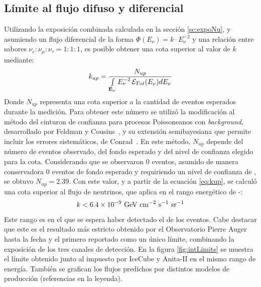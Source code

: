 	\subsection{L\'imite al flujo difuso y diferencial}
	
	Utilizando la exposici\'on combinada calculada en la secci\'on \ref{sc:expoNu}, y asumiendo un flujo diferencial de la forma $\Phi(E_\nu)= k\cdot E_\nu^{-2}$ y una relaci\'on entre sabores $\nu_e:\nu_\mu:\nu_\tau=1:1:1$, es posible obtener una cota superior al valor de $k$ mediante:
	\begin{equation}
	 k_{up}=\frac{N_{up}}{\int\limits_{\mathbf{E_{\nu}}} E_\nu^{-2}\,{\cal E}_{Tot}(E_\nu) dE_\nu}
	 \label{eq:kup}
	\end{equation}
	Donde $N_{up}$ representa una cota superior a la cantidad de eventos esperados durante la medici\'on.
	Para obtener este n\'umero se utiliz\'o la modificaci\'on al m\'etodo del cinturon de confianza para procesos Poissoneanos con \emph{background}, desarrollado por Feldman y Cousins~\cite{cite:Feldman-Cousins}, y su extensi\'on semibayesiana que permite incluir los errores sistem\'aticos, de Conrad~\cite{cite:Conrad_limit}.
	En este m\'etodo, $N_{up}$ depende del n\'umero de eventos observado, del fondo esperado y del nivel de confianza elegido para la cota.
	Considerando que se observaron 0 eventos, asumido de manera conservadora 0 eventos de fondo esperado y requiriendo un nivel de confianza de , se obtuvo $N_{up}=2.39$.
	Con este valor, y a partir de la ecuaci\'on \ref{eq:kup}, se calcul\'o una cota superior al flujo de neutrinos, que aplica en el rango energ\'etico de -:
	\begin{equation}
	k < 6.4 \times 10^{-9}~{\rm GeV~cm^{-2}~s^{-1}~sr^{-1}}
	\label{eq:limitePosta}
	\end{equation}
	Este rango es en el que se espera haber detectado el  de los eventos.
	Cabe destacar que este es el resultado m\'as estricto obtenido por el Observatorio Pierre Auger hasta la fecha y el primero reportado como un \'unico l\'imite, combinando la exposici\'on de los tres canales de detecci\'on.
	En la figura \ref{fig:intLimits} se muestra el límite obtenido junto al impuesto por IceCube y Anita-II en el mismo rango de energía.
	Tambi\'en se grafican los flujos predichos por distintos modelos de producci\'on (referencias en la leyenda).

